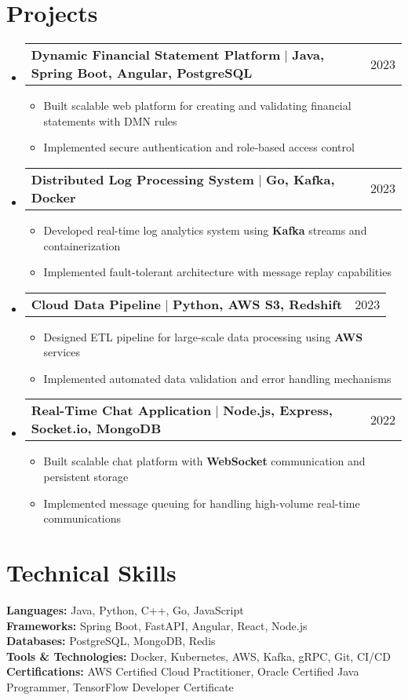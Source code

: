 \documentclass[letterpaper,11pt]{article}
\makeatletter
\newcommand{\resumeItem}[1]{
    \item\small{
            {#1 \vspace{-2pt}}
    }
}
\newcommand{\resumeProjectHeading}[2]{
    \item
    \begin{tabular*}{0.97\textwidth}{l@{\extracolsep{\fill}}r}
    \small#1 & #2 \\
    \end{tabular*}\vspace{-7pt}
}
\newcommand{\resumeSubHeadingListStart}{\begin{itemize}[leftmargin=0.15in, label={}]}
\newcommand{\resumeSubHeadingListEnd}{\end{itemize}}
\newcommand{\resumeItemListStart}{\begin{itemize}}
\newcommand{\resumeItemListEnd}{\end{itemize}\vspace{-5pt}}
\makeatother
\begin{document}
\section{Projects}
\resumeSubHeadingListStart
\resumeProjectHeading
{\textbf{Dynamic Financial Statement Platform} $|$ \textbf{Java, Spring Boot, Angular, PostgreSQL}}{2023}
\resumeItemListStart
\resumeItem{Built scalable web platform for creating and validating financial statements with DMN rules}
\resumeItem{Implemented secure authentication and role-based access control}
\resumeItemListEnd

\resumeProjectHeading
{\textbf{Distributed Log Processing System} $|$ \textbf{Go, Kafka, Docker}}{2023}
\resumeItemListStart
\resumeItem{Developed real-time log analytics system using \textbf{Kafka} streams and containerization}
\resumeItem{Implemented fault-tolerant architecture with message replay capabilities}
\resumeItemListEnd

\resumeProjectHeading
{\textbf{Cloud Data Pipeline} $|$ \textbf{Python, AWS S3, Redshift}}{2023}
\resumeItemListStart
\resumeItem{Designed ETL pipeline for large-scale data processing using \textbf{AWS} services}
\resumeItem{Implemented automated data validation and error handling mechanisms}
\resumeItemListEnd

\resumeProjectHeading
{\textbf{Real-Time Chat Application} $|$ \textbf{Node.js, Express, Socket.io, MongoDB}}{2022}
\resumeItemListStart
\resumeItem{Built scalable chat platform with \textbf{WebSocket} communication and persistent storage}
\resumeItem{Implemented message queuing for handling high-volume real-time communications}
\resumeItemListEnd
\resumeSubHeadingListEnd

\section{Technical Skills}
\begin{itemize}[leftmargin=0.15in, label={}]
\small{\item{
    \textbf{Languages:}{ Java, Python, C++, Go, JavaScript} \\
    \textbf{Frameworks:}{ Spring Boot, FastAPI, Angular, React, Node.js} \\
    \textbf{Databases:}{ PostgreSQL, MongoDB, Redis} \\
    \textbf{Tools \& Technologies:}{ Docker, Kubernetes, AWS, Kafka, gRPC, Git, CI/CD} \\
    \textbf{Certifications:}{ AWS Certified Cloud Practitioner, Oracle Certified Java Programmer, TensorFlow Developer Certificate}
}}
\end{itemize}
\end{document}
